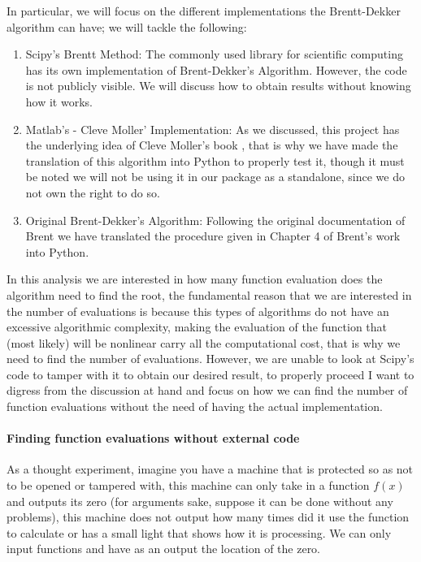 In particular, we will focus on the different implementations the Brentt-Dekker algorithm can have; we will tackle the following:
\begin{enumerate}
    \item Scipy's Brentt Method: The commonly used library for scientific computing has its own implementation of Brent-Dekker's Algorithm. However, the code is not publicly visible. We will discuss how to obtain results without knowing how it works.
    \item Matlab's - Cleve Moller' Implementation: As we discussed, this project has the underlying idea of Cleve Moller's book \cite{doi:10.1137/1.9780898717952}, that is why we have made the translation of this algorithm into Python to properly test it, though it must be noted we will not be using it in our package as a standalone, since we do not own the right to do so.
    \item Original Brent-Dekker's Algorithm: Following the original documentation of Brent \cite{brent2002algorithms} we have translated the procedure given in Chapter 4 of Brent's work into Python.
\end{enumerate}

In this analysis we are interested in how many function evaluation does the algorithm need to find the root, the fundamental reason that we are interested in the number of evaluations is because this types of algorithms do not have an excessive algorithmic complexity, making the evaluation of the function that (most likely) will be nonlinear carry all the computational cost, that is why we need to find the number of evaluations. However, we are unable to look at Scipy's code to tamper with it to obtain our desired result, to properly proceed I want to digress from the discussion at hand and focus on how we can find the number of function evaluations without the need of having the actual implementation.

\paragraph{Finding function evaluations without external code}
As a thought experiment, imagine you have a machine that is protected so as not to be opened or tampered with, this machine can only take in a function $f(x)$ and outputs its zero (for arguments sake, suppose it can be done without any problems), this machine does not output how many times did it use the function to calculate or has a small light that shows how it is processing. We can only input functions and have as an output the location of the zero. 




